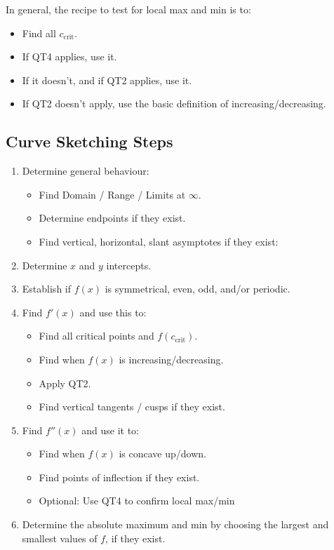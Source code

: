 \documentclass{article}
\begin{document}
In general, the recipe to test for local max and min is to:
\begin{itemize}
    \item Find all $c_\text{crit}$.
    \item If QT4 applies, use it.
    \item If it doesn't, and if QT2 applies, use it.
    \item If QT2 doesn't apply, use the basic definition of increasing/decreasing.
\end{itemize}
\subsection{Curve Sketching Steps}
\begin{enumerate}
    \item Determine general behaviour:
    \begin{itemize}
        \item Find Domain / Range / Limits at $\infty$.
        \item Determine endpoints if they exist.
        \item Find vertical, horizontal, slant asymptotes if they exist:
    \end{itemize}
    \item Determine $x$ and $y$ intercepts.
    \item Establish if $f(x)$ is symmetrical, even, odd, and/or periodic.
    \item Find $f'(x)$ and use this to:
    \begin{itemize}
        \item Find all critical points and $f(c_\text{crit})$.
        \item Find when $f(x)$ is increasing/decreasing.
        \item Apply QT2.
        \item Find vertical tangents / cusps if they exist.
    \end{itemize}
    \item Find $f''(x)$ and use it to:
    \begin{itemize}
        \item Find when $f(x)$ is concave up/down.
        \item Find points of inflection if they exist.
        \item Optional: Use QT4 to confirm local max/min
    \end{itemize}
    \item Determine the absolute maximum and min by choosing the largest and smallest values of $f$, if they exist.
\end{enumerate}
\end{document}
